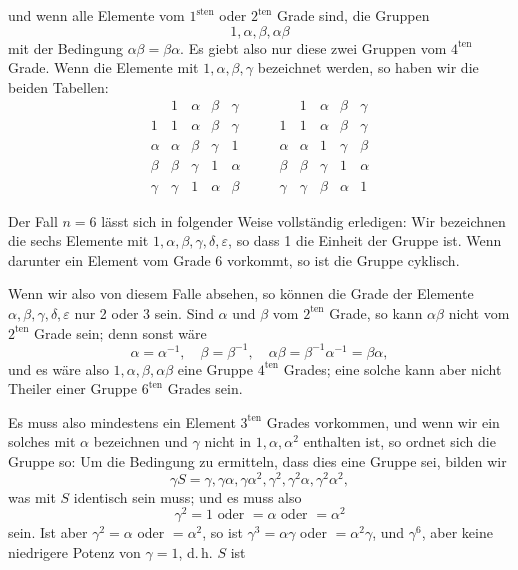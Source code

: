 und wenn alle Elemente vom $1^{\mathrm{sten}}$ oder $2^{\mathrm{ten}}$ Grade sind, die Gruppen
\[
1, \alpha, \beta, \alpha\beta
\]
mit der Bedingung $\alpha\beta = \beta\alpha$. Es giebt also nur diese zwei Gruppen vom $4^{\mathrm{ten}}$ Grade. Wenn die Elemente mit $1, \alpha, \beta, \gamma$ bezeichnet werden, so haben wir die beiden Tabellen:
\[
\begin{array}{c|cccc}
 & 1 & \alpha & \beta & \gamma \\
\hline
1 & 1 & \alpha & \beta & \gamma \\
\alpha & \alpha & \beta & \gamma & 1 \\
\beta & \beta & \gamma & 1 & \alpha \\
\gamma & \gamma & 1 & \alpha & \beta
\end{array}
\qquad
\begin{array}{c|cccc}
 & 1 & \alpha & \beta & \gamma \\
\hline
1 & 1 & \alpha & \beta & \gamma \\
\alpha & \alpha & 1 & \gamma & \beta \\
\beta & \beta & \gamma & 1 & \alpha \\
\gamma & \gamma & \beta & \alpha & 1
\end{array}
\]

Der Fall $n = 6$ lässt sich in folgender Weise vollständig erledigen: Wir bezeichnen die sechs Elemente mit $1, \alpha, \beta, \gamma, \delta, \varepsilon$, so dass 1 die Einheit der Gruppe ist. Wenn darunter ein Element vom Grade 6 vorkommt, so ist die Gruppe cyklisch.

Wenn wir also von diesem Falle absehen, so können die Grade der Elemente $\alpha, \beta, \gamma, \delta, \varepsilon$ nur 2 oder 3 sein. Sind $\alpha$ und $\beta$ vom $2^{\mathrm{ten}}$ Grade, so kann $\alpha\beta$ nicht vom $2^{\mathrm{ten}}$ Grade sein; denn sonst wäre
\[
\alpha = \alpha^{-1}, \quad \beta = \beta^{-1}, \quad \alpha\beta = \beta^{-1}\alpha^{-1} = \beta\alpha,
\]
und es wäre also $1, \alpha, \beta, \alpha\beta$ eine Gruppe $4^{\mathrm{ten}}$ Grades; eine solche kann aber nicht Theiler einer Gruppe $6^{\mathrm{ten}}$ Grades sein.

Es muss also mindestens ein Element $3^{\mathrm{ten}}$ Grades vorkommen, und wenn wir ein solches mit $\alpha$ bezeichnen und $\gamma$ nicht in $1, \alpha, \alpha^2$ enthalten ist, so ordnet sich die Gruppe so:
Um die Bedingung zu ermitteln, dass dies eine Gruppe sei, bilden wir
\[
\gamma S = \gamma, \gamma\alpha, \gamma\alpha^2, \gamma^2, \gamma^2\alpha, \gamma^2\alpha^2,
\]
was mit $S$ identisch sein muss; und es muss also
\[
\gamma^2 = 1 \text{ oder } = \alpha \text{ oder } = \alpha^2
\]
sein. Ist aber $\gamma^2 = \alpha$ oder $= \alpha^2$, so ist $\gamma^3 = \alpha\gamma$ oder $= \alpha^2\gamma$, und $\gamma^6$, aber keine niedrigere Potenz von $\gamma = 1$, d.\,h. $S$ ist

